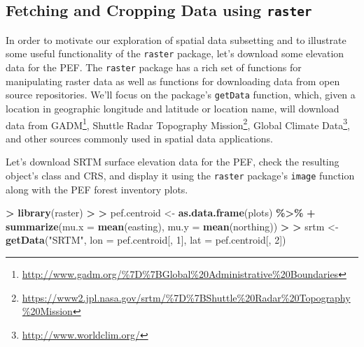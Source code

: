 \documentclass[
]{krantz}
\makeatletter
\newenvironment{Shaded}{\begin{snugshade}}{\end{snugshade}}
\newcommand{\DataTypeTok}[1]{\textcolor[rgb]{0.27,0.27,0.27}{#1}}
\newcommand{\DecValTok}[1]{\textcolor[rgb]{0.06,0.06,0.06}{#1}}
\newcommand{\ErrorTok}[1]{\textcolor[rgb]{0.14,0.14,0.14}{\textbf{#1}}}
\newcommand{\KeywordTok}[1]{\textcolor[rgb]{0.27,0.27,0.27}{\textbf{#1}}}
\newcommand{\NormalTok}[1]{#1}
\newcommand{\OperatorTok}[1]{\textcolor[rgb]{0.43,0.43,0.43}{\textbf{#1}}}
\newcommand{\StringTok}[1]{\textcolor[rgb]{0.5,0.5,0.5}{#1}}
\renewcommand{\href}[2]{#2\footnote{\url{#1}}}
\newenvironment{kframe}{%
\medskip{}
\setlength{\fboxsep}{.8em}
 \def\at@end@of@kframe{}%
 \ifinner\ifhmode%
  \def\at@end@of@kframe{\end{minipage}}%
  \begin{minipage}{\columnwidth}%
 \fi\fi%
 \def\FrameCommand##1{\hskip\@totalleftmargin \hskip-\fboxsep
 \colorbox{shadecolor}{##1}\hskip-\fboxsep
     \hskip-\linewidth \hskip-\@totalleftmargin \hskip\columnwidth}%
 \MakeFramed {\advance\hsize-\width
   \@totalleftmargin\z@ \linewidth\hsize
   \@setminipage}}%
 {\par\unskip\endMakeFramed%
 \at@end@of@kframe}
\renewenvironment{Shaded}{\begin{kframe}}{\end{kframe}}
\makeatother
\begin{document}
\hypertarget{fetching-and-cropping-data-using-raster}{%
\subsection{\texorpdfstring{Fetching and Cropping Data using \texttt{raster}}{Fetching and Cropping Data using raster}}\label{fetching-and-cropping-data-using-raster}}

In order to motivate our exploration of spatial data subsetting and to illustrate some useful functionality of the \texttt{raster} package, let's download some elevation data for the PEF. The \texttt{raster} package has a rich set of functions for manipulating raster data as well as functions for downloading data from open source repositories. We'll focus on the package's \texttt{getData} function, which, given a location in geographic longitude and latitude or location name, will download data from \href{http://www.gadm.org/\%7D\%7BGlobal\%20Administrative\%20Boundaries}{GADM}, \href{https://www2.jpl.nasa.gov/srtm/\%7D\%7BShuttle\%20Radar\%20Topography\%20Mission}{Shuttle Radar Topography Mission}, \href{http://www.worldclim.org/}{Global Climate Data}, and other sources commonly used in spatial data applications.

Let's download SRTM surface elevation data for the PEF, check the resulting object's class and CRS, and display it using the \texttt{raster} package's \texttt{image} function along with the PEF forest inventory plots.

\begin{Shaded}
\begin{Highlighting}[]
\OperatorTok{\textgreater{}}\StringTok{ }\KeywordTok{library}\NormalTok{(raster)}
\OperatorTok{\textgreater{}}\StringTok{ }
\ErrorTok{\textgreater{}}\StringTok{ }\NormalTok{pef.centroid \textless{}{-}}\StringTok{ }\KeywordTok{as.data.frame}\NormalTok{(plots) }\OperatorTok{\%\textgreater{}\%}\StringTok{ }
\OperatorTok{+}\StringTok{     }\KeywordTok{summarize}\NormalTok{(}\DataTypeTok{mu.x =} \KeywordTok{mean}\NormalTok{(easting), }\DataTypeTok{mu.y =} \KeywordTok{mean}\NormalTok{(northing))}
\OperatorTok{\textgreater{}}\StringTok{ }
\ErrorTok{\textgreater{}}\StringTok{ }\NormalTok{srtm \textless{}{-}}\StringTok{ }\KeywordTok{getData}\NormalTok{(}\StringTok{"SRTM"}\NormalTok{, }\DataTypeTok{lon =}\NormalTok{ pef.centroid[, }\DecValTok{1}\NormalTok{], }\DataTypeTok{lat =}\NormalTok{ pef.centroid[, }\DecValTok{2}\NormalTok{])}
\end{Highlighting}
\end{Shaded}
\end{document}
